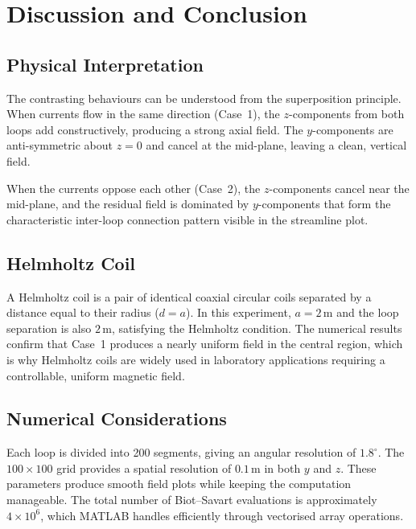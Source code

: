\documentclass[12pt,a4paper]{article}
\begin{document}
\section{Discussion and Conclusion}

\subsection{Physical Interpretation}

The contrasting behaviours can be understood from the superposition principle. When currents flow in the same direction (Case~1), the $z$-components from both loops add constructively, producing a strong axial field. The $y$-components are anti-symmetric about $z = 0$ and cancel at the mid-plane, leaving a clean, vertical field.

When the currents oppose each other (Case~2), the $z$-components cancel near the mid-plane, and the residual field is dominated by $y$-components that form the characteristic inter-loop connection pattern visible in the streamline plot.

\subsection{Helmholtz Coil}

A Helmholtz coil is a pair of identical coaxial circular coils separated by a distance equal to their radius ($d = a$). In this experiment, $a = 2\,\mathrm{m}$ and the loop separation is also $2\,\mathrm{m}$, satisfying the Helmholtz condition. The numerical results confirm that Case~1 produces a nearly uniform field in the central region, which is why Helmholtz coils are widely used in laboratory applications requiring a controllable, uniform magnetic field.

\subsection{Numerical Considerations}

Each loop is divided into 200 segments, giving an angular resolution of $1.8^{\circ}$. The $100 \times 100$ grid provides a spatial resolution of $0.1\,\mathrm{m}$ in both $y$ and $z$. These parameters produce smooth field plots while keeping the computation manageable. The total number of Biot--Savart evaluations is approximately $4 \times 10^{6}$, which MATLAB handles efficiently through vectorised array operations.
\end{document}
